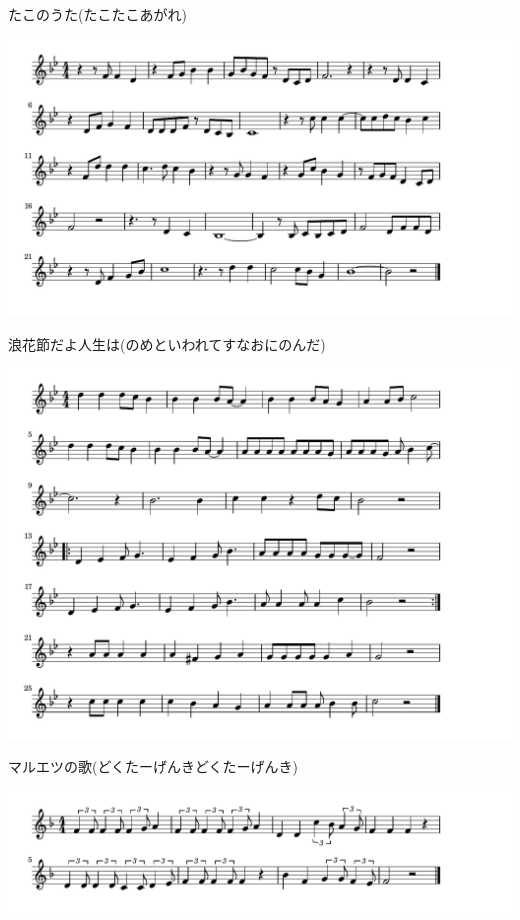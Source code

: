 \documentclass[a4paper]{ltjsarticle}
\begin{document}
\vspace{-10mm} \hspace{10mm}
たこのうた(たこたこあがれ)

\includegraphics[clip]{naniwabushi_crop.pdf}

\vspace{-10mm} \hspace{10mm}
浪花節だよ人生は(のめといわれてすなおにのんだ)

\includegraphics[clip]{maruetsu_crop.pdf}

\vspace{-10mm} \hspace{10mm}
マルエツの歌(どくたーげんきどくたーげんき)

\includegraphics[clip]{lawsonhyaku_crop.pdf}
\end{document}
